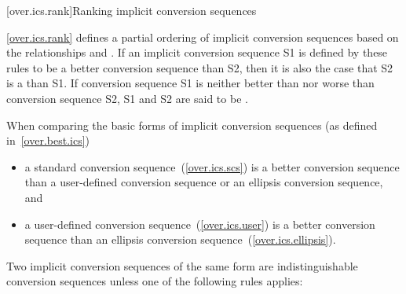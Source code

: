 [over.ics.rank]{Ranking implicit conversion sequences}

\pnum
\ref{over.ics.rank} defines a partial ordering of implicit conversion
sequences based on the relationships
and
.
If an implicit conversion sequence S1 is
defined by these rules to be a better conversion sequence than
S2, then it is also the case that S2 is a
than S1.
If conversion sequence S1 is neither better
than nor worse than conversion sequence S2, S1 and S2 are said to
be
.

\pnum
When comparing the basic forms of implicit conversion sequences
(as defined in~\ref{over.best.ics})

\begin{itemize}
\item
a standard conversion sequence~(\ref{over.ics.scs}) is a better
conversion sequence than a user-defined conversion sequence
or an ellipsis conversion sequence, and
\item
a user-defined conversion sequence~(\ref{over.ics.user}) is a
better conversion sequence than an ellipsis conversion
sequence~(\ref{over.ics.ellipsis}).
\end{itemize}

\pnum
Two implicit conversion sequences of the same form are
indistinguishable conversion sequences unless one of the
following rules applies:

